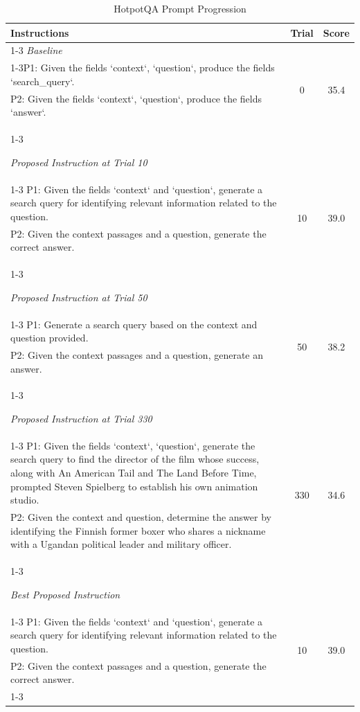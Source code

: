 \begin{table}[ht]
\centering
\footnotesize
\begin{tabularx}{\textwidth}{Xcc}
\hline
\textbf{Instructions} & \textbf{Trial} & \textbf{Score} \\ \hline
\cline{1-3}
\textit{Baseline} \\
\cline{1-3}P1: Given the fields `context`, `question`, produce the fields `search\_query`. & \multirow{2}{*}{0} & \multirow{2}{*}{35.4} \\
P2: Given the fields `context`, `question`, produce the fields `answer`. & & \\
\cline{1-3}

\textit{Proposed Instruction at Trial 10} \\
\cline{1-3}
P1: Given the fields `context` and `question`, generate a search query for identifying relevant information related to the question. & \multirow{2}{*}{10} & \multirow{2}{*}{39.0} \\
P2: Given the context passages and a question, generate the correct answer. & & \\
\cline{1-3}

\textit{Proposed Instruction at Trial 50} \\
\cline{1-3}
P1: Generate a search query based on the context and question provided. & \multirow{2}{*}{50} & \multirow{2}{*}{38.2} \\
P2: Given the context passages and a question, generate an answer. & & \\
\cline{1-3}

\textit{Proposed Instruction at Trial 330} \\
\cline{1-3}
P1: Given the fields `context`, `question`, generate the search query to find the director of the film whose success, along with An American Tail and The Land Before Time, prompted Steven Spielberg to establish his own animation studio. & \multirow{2}{*}{330} & \multirow{2}{*}{34.6} \\
P2: Given the context and question, determine the answer by identifying the Finnish former boxer who shares a nickname with a Ugandan political leader and military officer. & & \\
\cline{1-3}

\textit{Best Proposed Instruction} \\
\cline{1-3}
P1: Given the fields `context` and `question`, generate a search query for identifying relevant information related to the question. & \multirow{2}{*}{10} & \multirow{2}{*}{39.0} \\
P2: Given the context passages and a question, generate the correct answer. & & \\
\cline{1-3}

\hline
\end{tabularx}
\caption{HotpotQA Prompt Progression}
\label{table:HotpotQA_prompt_progression}
\end{table}

